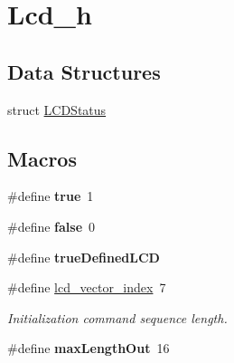 \hypertarget{group__lcd__h}{\section{Lcd\-\_\-h}
\label{group__lcd__h}
}
\subsection*{Data Structures}
\begin{DoxyCompactItemize}
\item 
struct \hyperlink{struct_l_c_d_status}{L\-C\-D\-Status}
\end{DoxyCompactItemize}
\subsection*{Macros}
\begin{DoxyCompactItemize}
\item 
\hypertarget{group__lcd__h_ga41f9c5fb8b08eb5dc3edce4dcb37fee7}{\#define {\bfseries true}~1}\label{group__lcd__h_ga41f9c5fb8b08eb5dc3edce4dcb37fee7}

\item 
\hypertarget{group__lcd__h_ga65e9886d74aaee76545e83dd09011727}{\#define {\bfseries false}~0}\label{group__lcd__h_ga65e9886d74aaee76545e83dd09011727}

\item 
\hypertarget{group__lcd__h_gaef9bf496a2e7dbc60c216b18b4a4b770}{\#define {\bfseries true\-Defined\-L\-C\-D}}\label{group__lcd__h_gaef9bf496a2e7dbc60c216b18b4a4b770}

\item 
\hypertarget{group__lcd__h_ga5b5f7e083c03030e46ef30ba2f9a4807}{\#define \hyperlink{group__lcd__h_ga5b5f7e083c03030e46ef30ba2f9a4807}{lcd\-\_\-vector\-\_\-index}~7}\label{group__lcd__h_ga5b5f7e083c03030e46ef30ba2f9a4807}

\begin{DoxyCompactList}\small\item\em Initialization command sequence length. \end{DoxyCompactList}\item 
\hypertarget{group__lcd__h_gac707227d799959d68d984285c3238228}{\#define {\bfseries max\-Length\-Out}~16}\label{group__lcd__h_gac707227d799959d68d984285c3238228}

\end{DoxyCompactItemize}
